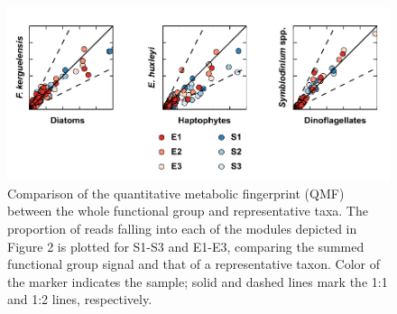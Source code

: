 \begin{figure}[p!]
  \centering
    \includegraphics[width=1\textwidth]{Images/C4_FigureS3.pdf}
    \caption[Comparison of the quantitative metabolic fingerprint (QMF) between the whole functional group and representative taxa]{Comparison of the quantitative metabolic fingerprint (QMF) between the whole functional group and representative taxa. The proportion of reads falling into each of the modules depicted in Figure 2 is plotted for S1-S3 and E1-E3, comparing the summed functional group signal and that of a representative taxon. Color of the marker indicates the sample; solid and dashed lines mark the 1:1 and 1:2 lines, respectively.}
  \label{fig:a4f3}
\end{figure}


